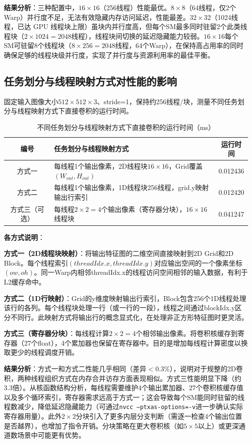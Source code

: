 \documentclass{SYSUReport}
\begin{document}
\textbf{结果分析}：三种配置中，$16\times16$（256线程）性能最优。$8\times8$（64线程，仅2个Warp）并行度不足，无法有效隐藏内存访问延迟，性能最差。$32\times32$（1024线程，已达 GPU 线程块上限）虽块内并行度高，但每个SM最多同时驻留2个此类线程块（$2\times1024=2048$线程），线程块间切换的延迟隐藏能力较弱。$16\times16$每个SM可驻留8个线程块（$8\times256=2048$线程，64个Warp），在保持高占用率的同时确保足够的线程块级并行度，实现了并行度与资源利用率的最佳平衡。

\subsection{任务划分与线程映射方式对性能的影响}
固定输入图像大小$512\times512\times3$、stride=1，保持约256线程/块，测量不同任务划分与线程映射方式下直接卷积的运行时间。

\begin{table}[H]
\centering
\caption{不同任务划分与线程映射方式下直接卷积的运行时间（ms）}
\label{tab:mapping}
\begin{tabularx}{0.92\textwidth}{|c|X|c|}
\hline
编号 & 任务划分与线程映射方式 & 运行时间 \\
\hline
方式一 & 每线程1个输出像素，2D线程块$16\times16$，Grid覆盖$(W_{out},H_{out})$ & 0.012436 \\
\hline
方式二 & 每线程1个输出像素，1D线程块256线程，grid.y映射输出行索引 & 0.012420 \\
\hline
方式三（可选） & 每线程$2\times2=4$个输出像素（寄存器分块），$16\times16$线程块 & 0.041247 \\
\hline
\end{tabularx}
\end{table}

\textbf{各方式说明}：

\textbf{方式一（2D线程块映射）}：将输出特征图的二维空间直接映射到2D Grid和2D Block。每个线程索引$(threadIdx.x, threadIdx.y)$对应输出空间的一个像素坐标$(ow, oh)$。同一Warp内相邻threadIdx.x的线程访问空间相邻的输入数据，有利于L2缓存命中。

\textbf{方式二（1D行映射）}：Grid的y维度映射输出行索引，Block包含256个1D线程处理该行的各列。每个线程块处理一行（或一行的一段），线程之间通过blockIdx.y区分不同行。此映射方式将输出行的概念显式化，在处理非正方形特征图时更灵活。

\textbf{方式三（寄存器分块）}：每线程计算$2\times2=4$个相邻输出像素。将卷积核缓存到寄存器（27个float），4个累加器也保留在寄存器中。目的是增加每线程计算密度以换取更少的线程调度开销。

\textbf{结果分析}：方式一和方式二性能几乎相同（差异$<0.3\%$），说明对于规整的2D卷积，两种线程组织方式在内存合并访存方面表现相似。方式三性能明显下降（约3.3倍）。从核函数结构分析，每线程需要维护4个输出累加器、27个卷积核缓存值以及多个循环索引，寄存器需求远高于方式一；这会导致每个SM能同时驻留的线程数减少，降低延迟隐藏能力（可通过\texttt{nvcc --ptxas-options=-v}进一步确认实际寄存器用量）。此外$2\times2$分块引入了更多内层分支判断（需逐一检查4个输出位置是否越界），也增加了指令开销。分块策略在更大卷积核（如$5\times5$以上）或更深通道数场景中可能更有优势。
\end{document}
